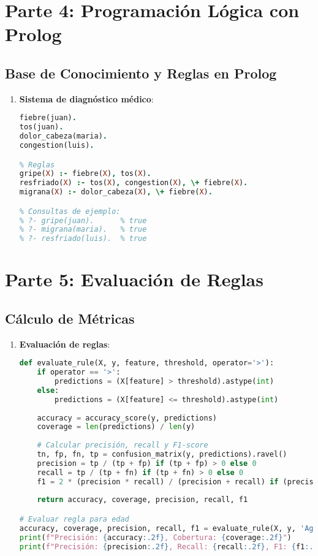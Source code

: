 \documentclass[a4paper,12pt]{article}
\begin{document}
\section{Parte 4: Programación Lógica con Prolog}

\subsection{Base de Conocimiento y Reglas en Prolog}
\begin{enumerate}
    \item \textbf{Sistema de diagnóstico médico}:
    \begin{lstlisting}[language=Prolog]
% Base de hechos
fiebre(juan).
tos(juan).
dolor_cabeza(maria).
congestion(luis).

% Reglas
gripe(X) :- fiebre(X), tos(X).
resfriado(X) :- tos(X), congestion(X), \+ fiebre(X).
migrana(X) :- dolor_cabeza(X), \+ fiebre(X).

% Consultas de ejemplo:
% ?- gripe(juan).      % true
% ?- migrana(maria).   % true
% ?- resfriado(luis).  % true
    \end{lstlisting}
\end{enumerate}

\section{Parte 5: Evaluación de Reglas}

\subsection{Cálculo de Métricas}
\begin{enumerate}
    \item \textbf{Evaluación de reglas}:
    \begin{lstlisting}[language=Python]
def evaluate_rule(X, y, feature, threshold, operator='>'):
    if operator == '>':
        predictions = (X[feature] > threshold).astype(int)
    else:
        predictions = (X[feature] <= threshold).astype(int)
    
    accuracy = accuracy_score(y, predictions)
    coverage = len(predictions) / len(y)
    
    # Calcular precisión, recall y F1-score
    tn, fp, fn, tp = confusion_matrix(y, predictions).ravel()
    precision = tp / (tp + fp) if (tp + fp) > 0 else 0
    recall = tp / (tp + fn) if (tp + fn) > 0 else 0
    f1 = 2 * (precision * recall) / (precision + recall) if (precision + recall) > 0 else 0
    
    return accuracy, coverage, precision, recall, f1

# Evaluar regla para edad
accuracy, coverage, precision, recall, f1 = evaluate_rule(X, y, 'Age', 30, '>')
print(f"Precisión: {accuracy:.2f}, Cobertura: {coverage:.2f}")
print(f"Precisión: {precision:.2f}, Recall: {recall:.2f}, F1: {f1:.2f}")
    \end{lstlisting}
\end{enumerate}
\end{document}
